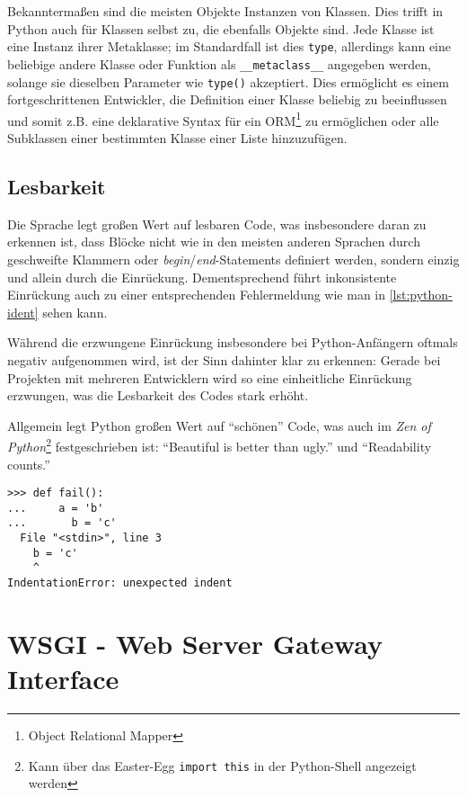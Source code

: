 Bekanntermaßen sind die meisten Objekte Instanzen von Klassen. Dies trifft in Python auch für
Klassen selbst zu, die ebenfalls Objekte sind. Jede Klasse ist eine Instanz ihrer Metaklasse; im
Standardfall ist dies \lstinline{type}, allerdings kann eine beliebige andere Klasse oder Funktion
als \lstinline{__metaclass__} angegeben werden, solange sie dieselben Parameter wie
\lstinline{type()} akzeptiert. Dies ermöglicht es einem fortgeschrittenen Entwickler, die Definition
einer Klasse beliebig zu beeinflussen und somit z.B. eine deklarative Syntax für ein
ORM\footnote{Object Relational Mapper} zu ermöglichen oder alle Subklassen einer bestimmten Klasse
einer Liste hinzuzufügen.



\subsection{Lesbarkeit}

Die Sprache legt großen Wert auf lesbaren Code, was insbesondere daran zu erkennen ist, dass Blöcke
nicht wie in den meisten anderen Sprachen durch geschweifte Klammern oder
\emph{begin}/\emph{end}-Statements definiert werden, sondern einzig und allein durch die Einrückung.
Dementsprechend führt inkonsistente Einrückung auch zu einer entsprechenden Fehlermeldung wie man in
\autoref{lst:python-ident} sehen kann.

Während die erzwungene Einrückung insbesondere bei Python-Anfängern oftmals negativ aufgenommen
wird, ist der Sinn dahinter klar zu erkennen: Gerade bei Projekten mit mehreren Entwicklern wird so
eine einheitliche Einrückung erzwungen, was die Lesbarkeit des Codes stark erhöht.

Allgemein legt Python großen Wert auf \enquote{schönen} Code, was auch im \emph{Zen of
Python}\footnote{Kann über das Easter-Egg \lstinline{import this} in der Python-Shell angezeigt
werden}
festgeschrieben ist:
\enquote{Beautiful is better than ugly.} und \enquote{Readability counts.} \citep{zenofpython}

\begin{lstlisting}[caption=Fehlerhafte Einrückung,label=lst:python-ident]
>>> def fail():
...     a = 'b'
...       b = 'c'
  File "<stdin>", line 3
    b = 'c'
    ^
IndentationError: unexpected indent
\end{lstlisting}




\section{WSGI - Web Server Gateway Interface}

